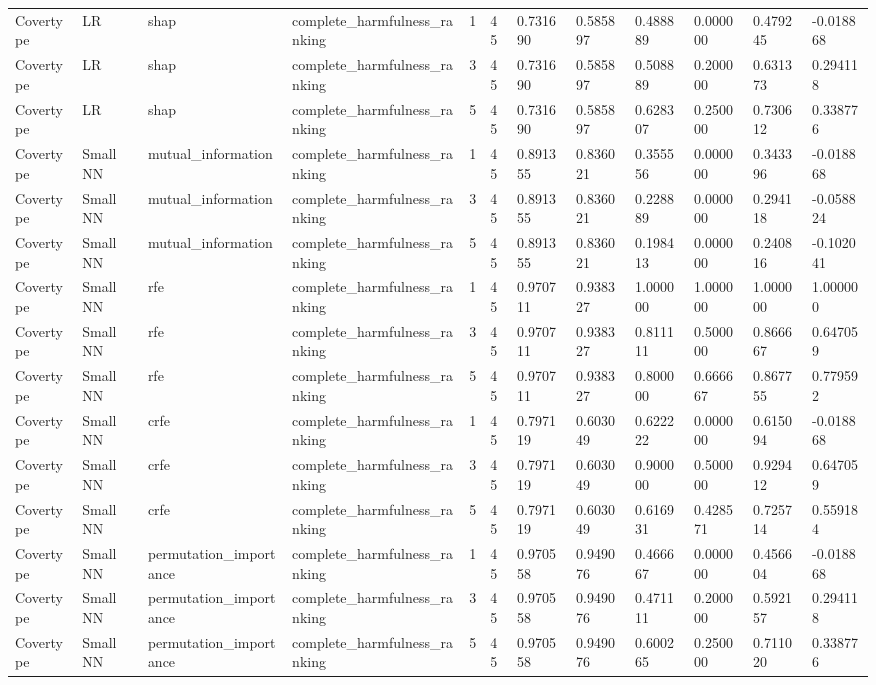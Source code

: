 \begin{table}[t]
\begin{tabular}{llllllllllll}
Covertype & LR & shap & complete\_harmfulness\_ranking & 1 & 45 & 0.731690 & 0.585897 & 0.488889 & 0.000000 & 0.479245 & -0.018868 \\
Covertype & LR & shap & complete\_harmfulness\_ranking & 3 & 45 & 0.731690 & 0.585897 & 0.508889 & 0.200000 & 0.631373 & 0.294118 \\
Covertype & LR & shap & complete\_harmfulness\_ranking & 5 & 45 & 0.731690 & 0.585897 & 0.628307 & 0.250000 & 0.730612 & 0.338776 \\
Covertype & Small NN & mutual\_information & complete\_harmfulness\_ranking & 1 & 45 & 0.891355 & 0.836021 & 0.355556 & 0.000000 & 0.343396 & -0.018868 \\
Covertype & Small NN & mutual\_information & complete\_harmfulness\_ranking & 3 & 45 & 0.891355 & 0.836021 & 0.228889 & 0.000000 & 0.294118 & -0.058824 \\
Covertype & Small NN & mutual\_information & complete\_harmfulness\_ranking & 5 & 45 & 0.891355 & 0.836021 & 0.198413 & 0.000000 & 0.240816 & -0.102041 \\
Covertype & Small NN & rfe & complete\_harmfulness\_ranking & 1 & 45 & 0.970711 & 0.938327 & 1.000000 & 1.000000 & 1.000000 & 1.000000 \\
Covertype & Small NN & rfe & complete\_harmfulness\_ranking & 3 & 45 & 0.970711 & 0.938327 & 0.811111 & 0.500000 & 0.866667 & 0.647059 \\
Covertype & Small NN & rfe & complete\_harmfulness\_ranking & 5 & 45 & 0.970711 & 0.938327 & 0.800000 & 0.666667 & 0.867755 & 0.779592 \\
Covertype & Small NN & crfe & complete\_harmfulness\_ranking & 1 & 45 & 0.797119 & 0.603049 & 0.622222 & 0.000000 & 0.615094 & -0.018868 \\
Covertype & Small NN & crfe & complete\_harmfulness\_ranking & 3 & 45 & 0.797119 & 0.603049 & 0.900000 & 0.500000 & 0.929412 & 0.647059 \\
Covertype & Small NN & crfe & complete\_harmfulness\_ranking & 5 & 45 & 0.797119 & 0.603049 & 0.616931 & 0.428571 & 0.725714 & 0.559184 \\
Covertype & Small NN & permutation\_importance & complete\_harmfulness\_ranking & 1 & 45 & 0.970558 & 0.949076 & 0.466667 & 0.000000 & 0.456604 & -0.018868 \\
Covertype & Small NN & permutation\_importance & complete\_harmfulness\_ranking & 3 & 45 & 0.970558 & 0.949076 & 0.471111 & 0.200000 & 0.592157 & 0.294118 \\
Covertype & Small NN & permutation\_importance & complete\_harmfulness\_ranking & 5 & 45 & 0.970558 & 0.949076 & 0.600265 & 0.250000 & 0.711020 & 0.338776 \\

\end{tabular}
\end{table}
